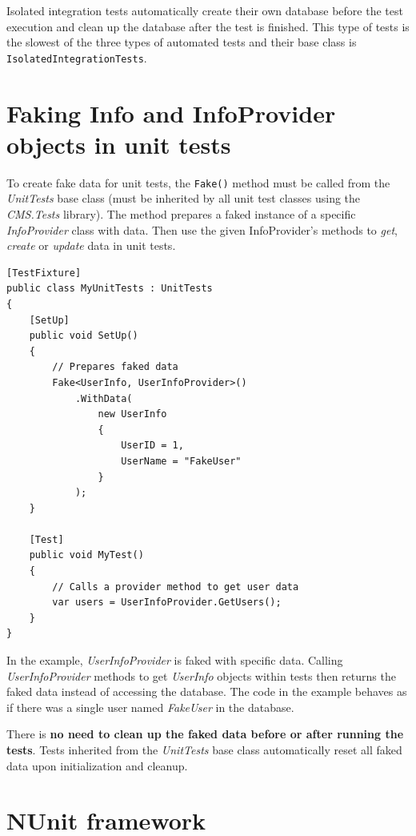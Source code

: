 \documentclass[
  print,
  table,
  nolof,
  nolot,
  nocover,
  oneside
]{fithesis3}
\begin{document}
Isolated integration tests automatically create their own database before the test execution and clean up the database after the test is finished. This type of tests is the slowest of the three types of automated tests and their base class is \texttt{IsolatedIntegrationTests}.


\section{Faking Info and InfoProvider objects in unit tests}
\label{faking objects}

To create fake data for unit tests, the \texttt{Fake()} method must be called from the \textit{UnitTests} base class (must be inherited by all unit test classes using the \textit{CMS.Tests} library). The method prepares a faked instance of a specific \textit{InfoProvider} class with data. Then use the given InfoProvider's methods to \textit{get}, \textit{create} or \textit{update} data in unit tests.
\begin{lstlisting}
[TestFixture]
public class MyUnitTests : UnitTests
{
    [SetUp]
    public void SetUp()
    {
        // Prepares faked data
        Fake<UserInfo, UserInfoProvider>()
            .WithData(
                new UserInfo
                {
                    UserID = 1,
                    UserName = "FakeUser"
                }
            );
    }

    [Test]
    public void MyTest()
    {
        // Calls a provider method to get user data
        var users = UserInfoProvider.GetUsers();
    }
}
\end{lstlisting}
In the example, \textit{UserInfoProvider} is faked with specific data. Calling \textit{UserInfoProvider} methods to get \textit{UserInfo} objects within tests then returns the faked data instead of accessing the database. The code in the example behaves as if there was a single user named \textit{FakeUser} in the database\parencite{faking_kentico}.

There is \textbf{no need to clean up the faked data before or after running the tests}. Tests inherited from the \textit{UnitTests} base class automatically reset all faked data upon initialization and cleanup.


\section{NUnit framework}
\label{nunit}
\end{document}
